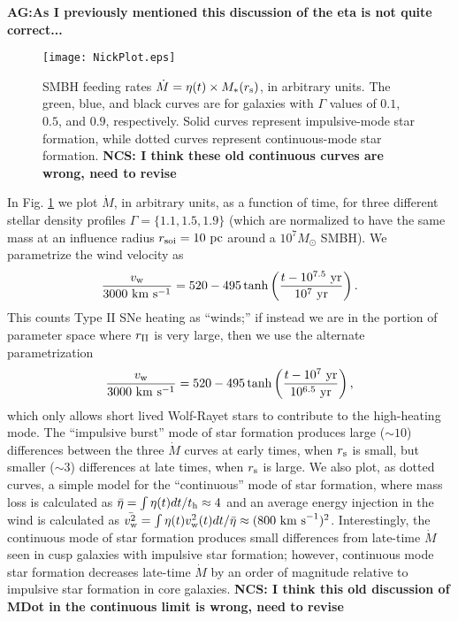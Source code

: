{\bf AG:As I previously mentioned this discussion of the eta is not
  quite correct...}
\begin{figure}
\texttt{[image: NickPlot.eps]}
\caption{\label{NickPlot} SMBH feeding rates $\dot{M}=\eta(t) \times M_*(r_{\rm s})$, in arbitrary units.  The green, blue, and black curves are for galaxies with $\Gamma$ values of $0.1$, $0.5$, and $0.9$, respectively.  Solid curves represent impulsive-mode star formation, while dotted curves represent continuous-mode star formation. {\bf NCS: I think these old continuous curves are wrong, need to revise}}
\end{figure}

In Fig. \ref{NickPlot} we plot $\dot{M}$, in arbitrary units, as a
function of time, for three different stellar density profiles $\Gamma
= \{1.1, 1.5, 1.9\}$ (which are normalized to have the same mass at an
influence radius $r _{\rm soi}=10~{\rm pc}$ around a $10^7M_\odot$
SMBH).  We parametrize the wind velocity as
\begin{equation} \frac{v_{\rm w}}{3000 ~\rm
km~s^{-1}}=520-495\tanh\left( \frac{t-10^{7.5}~{\rm yr}}{10^{7}~{\rm
yr}}\right). \label{NickV1}
\end{equation} This counts Type II SNe heating as ``winds;'' if
instead we are in the portion of parameter space where $r_{\rm II}$ is
very large, then we use the alternate parametrization
\begin{equation} \frac{v_{\rm w}}{3000 ~\rm
km~s^{-1}}=520-495\tanh\left( \frac{t-10^{7}~{\rm yr}}{10^{6.5}~{\rm
yr}}\right), \label{NickV2}
\end{equation} which only allows short lived Wolf-Rayet stars to
contribute to the high-heating mode.  The ``impulsive burst'' mode of
star formation produces large ($\sim 10$) differences between the
three $\dot{M}$ curves at early times, when $r_{\rm s}$ is small, but
smaller ($\sim 3$) differences at late times, when $r_{\rm s}$ is
large.  We also plot, as dotted curves, a simple model for the
``continuous'' mode of star formation, where mass loss is calculated
as $\bar{\eta} = \int\eta(t)dt/t_{\rm h} \approx 4$ and an average
energy injection in the wind is calculated as $\bar{v_{\rm
w}^2}=\int\eta(t)v_{\rm w}^2(t)dt/\bar{\eta} \approx (800~{\rm
km~s}^{-1})^2$.  Interestingly, the continuous mode of star formation
produces small differences from late-time $\dot{M}$ seen in cusp
galaxies with impulsive star formation; however, continuous mode star
formation decreases late-time $\dot{M}$ by an order of magnitude
relative to impulsive star formation in core galaxies.  {\bf NCS: I
think this old discussion of MDot in the continuous limit is wrong,
need to revise}

